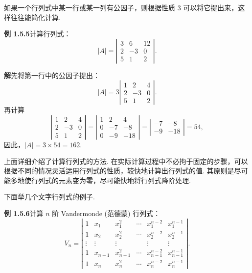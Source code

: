 \documentclass[UTF8, 12pt, fontset=fandol, oneside]{ctexart}
\begin{document}
如果一个行列式中某一行或某一列有公因子，则根据性质 3 可以将它提出来，这样往往能简化计算.

\noindent\textbf{例 1.5.5}\quad 计算行列式：
\[
|A|=\left|\begin{array}{rrr}
3 & 6 & 12\\
2 & -3 & 0\\
5 & 1 & 2
\end{array}\right|.
\]

\noindent\textbf{解}\quad 先将第一行中的公因子提出：
\[
|A|=3
\left|\begin{array}{rrr}
1 & 2 & 4\\
2 & -3 & 0\\
5 & 1 & 2
\end{array}\right|.
\]
再计算
\[
\left|\begin{array}{rrr}
1 & 2 & 4\\
2 & -3 & 0\\
5 & 1 & 2
\end{array}\right|
=
\left|\begin{array}{rrr}
1 & 2 & 4\\
0 & -7 & -8\\
0 & -9 & -18
\end{array}\right|
=
\left|\begin{array}{rr}
-7 & -8\\
-9 & -18
\end{array}\right|=54,
\]
因此，$|A|=3\times 54=162$.

上面详细介绍了计算行列式的方法. 在实际计算过程中不必拘于固定的步骤，可以根据不同的情况灵活运用行列式的性质，较快地计算出行列式的值. 其原则是尽可能多地使行列式的元素变为零，尽可能快地将行列式降阶处理.

下面举几个文字行列式的例子.

\noindent\textbf{例 1.5.6}\quad 计算 $n$ 阶 Vandermonde (范德蒙) 行列式：
\[
V_n=
\left|\begin{array}{cccccc}
1 & x_1 & x_1^2 & \cdots & x_1^{n-2} & x_1^{n-1}\\
1 & x_2 & x_2^2 & \cdots & x_2^{n-2} & x_2^{n-1}\\
\vdots & \vdots & \vdots & & \vdots & \vdots\\
1 & x_{n-1} & x_{n-1}^2 & \cdots & x_{n-1}^{n-2} & x_{n-1}^{n-1}\\
1 & x_n & x_n^2 & \cdots & x_n^{n-2} & x_n^{n-1}
\end{array}\right|.
\]
\end{document}
